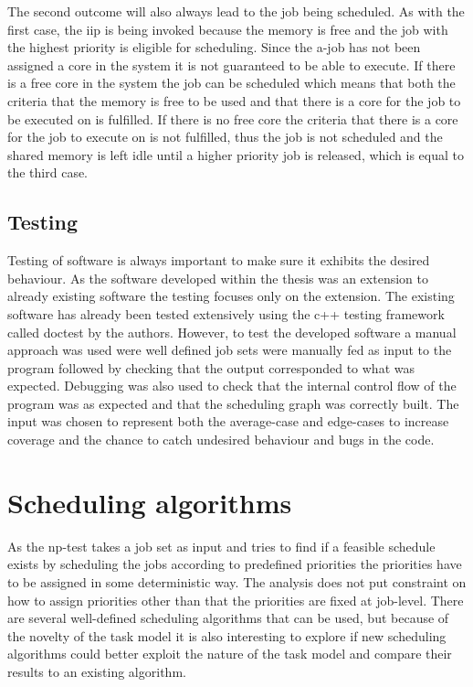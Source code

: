 \documentclass{kththesis}
\begin{document}
The second outcome will also always lead to the job being scheduled. As with the first case, the
\acrshort{iip} is being invoked because the memory is free and the job with the highest priority is
eligible for scheduling. Since the \acrshort{a}-job has not been assigned a core in the system
it is not guaranteed to be able to execute. If there is a free core in the system the job can be
scheduled which means that both the criteria that the memory is free to be used and that there is a
core for the job to be executed on is fulfilled. If there is no free core the criteria that there is
a core for the job to execute on is not fulfilled, thus the job is not scheduled and the shared
memory is left idle until a higher priority job is released, which is equal to the third case.


\subsection{Testing}

Testing of software is always important to make sure it exhibits the desired behaviour. As the
software developed within the thesis was an extension to already existing software the testing
focuses only on the extension. The existing software has already been tested extensively using the
c++ testing framework called doctest by the authors. However, to test the developed software a
manual approach was used were well defined job sets were manually fed as input to the program
followed by checking that the output corresponded to what was expected. Debugging was also used to
check that the internal control flow of the program was as expected and that the scheduling graph
was correctly built. The input was chosen to
represent both the average-case and edge-cases to increase coverage and the chance to catch
undesired behaviour and bugs in the code.


\section{Scheduling algorithms} \label{sec:scheduling_algorithms}

As the \acrshort{np}-test takes a job set as input and tries to find if a feasible schedule exists
by scheduling the jobs according to predefined priorities the priorities have to be assigned in some
deterministic way. The analysis does not put constraint on how to assign priorities other than that
the priorities are fixed at job-level. There are several well-defined scheduling algorithms that can be
used, but because of the novelty of the task model it is also interesting to explore if new
scheduling algorithms could better exploit the nature of the task model and compare their results to
an existing algorithm.
\end{document}

